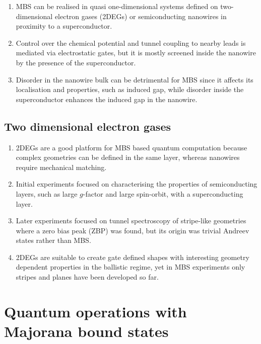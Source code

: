\begin{enumerate}
\item MBS can be realised in quasi one-dimensional systems defined on two-dimensional electron gases (2DEGs) or semiconducting nanowires in proximity to a superconductor.
 \item Control over the chemical potential and tunnel coupling to nearby leads is mediated via electrostatic gates, but it is mostly screened inside the nanowire by the presence of the superconductor.
\item Disorder in the nanowire bulk can be detrimental for MBS since it affects its localisation and properties, such as induced gap, while disorder inside the superconductor enhances the induced gap in the nanowire.
\end{enumerate}

\subsection{Two dimensional electron gases}

\begin{enumerate}
\item 2DEGs are a good platform for MBS based quantum computation because complex geometries can be defined in the same layer, whereas nanowires require mechanical matching.
\item Initial experiments\cite{Shabani2015,Kjaergaard2016} focused on characterising the properties of semiconducting layers, such as large $g$-factor and large spin-orbit, with a superconducting layer.
\item Later experiments focused on tunnel spectroscopy of stripe-like geometries\cite{Suominen2017} where a zero bias peak (ZBP) was found, but its origin was trivial Andreev states rather than MBS.
\item 2DEGs are suitable to create gate defined shapes with interesting geometry dependent properties in the ballistic regime, yet in MBS experiments only stripes and planes have been developed so far.
\end{enumerate}


\section{Quantum operations with Majorana bound states}

